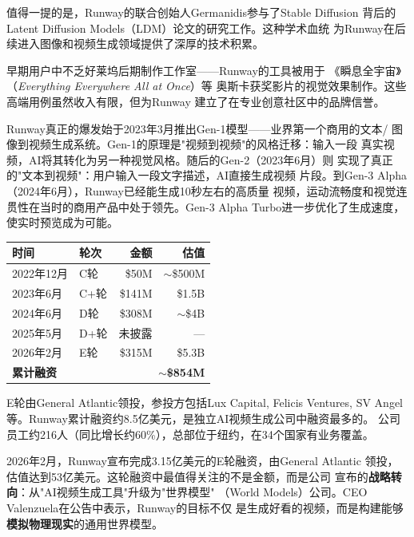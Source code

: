 值得一提的是，Runway的联合创始人Germanidis参与了Stable Diffusion
背后的Latent Diffusion Models（LDM）论文的研究工作。这种学术血统
为Runway在后续进入图像和视频生成领域提供了深厚的技术积累。

早期用户中不乏好莱坞后期制作工作室——Runway的工具被用于
《瞬息全宇宙》（\textit{Everything Everywhere All at Once}）等
奥斯卡获奖影片的视觉效果制作。这些高端用例虽然收入有限，但为Runway
建立了在专业创意社区中的品牌信誉。

Runway真正的爆发始于2023年3月推出Gen-1模型——业界第一个商用的文本/
图像到视频生成系统。Gen-1的原理是"视频到视频"的风格迁移：输入一段
真实视频，AI将其转化为另一种视觉风格。随后的Gen-2（2023年6月）则
实现了真正的"文本到视频"：用户输入一段文字描述，AI直接生成视频
片段。到Gen-3 Alpha（2024年6月），Runway已经能生成10秒左右的高质量
视频，运动流畅度和视觉连贯性在当时的商用产品中处于领先。Gen-3
Alpha Turbo进一步优化了生成速度，使实时预览成为可能。

\begin{keybox}
\small
\begin{tabularx}{\textwidth}{l l r r}
\toprule
\rowcolor{figLightGray}
\textbf{时间} & \textbf{轮次} & \textbf{金额} & \textbf{估值} \\
\midrule
2022年12月  & C轮     & \$50M    & $\sim$\$500M \\
2023年6月   & C+轮    & \$141M   & \$1.5B \\
2024年6月   & D轮     & \$308M   & $\sim$\$4B \\
2025年5月   & D+轮    & 未披露   & ---  \\
2026年2月   & E轮     & \$315M   & \$5.3B \\
\midrule
\multicolumn{2}{l}{\textbf{累计融资}} & \multicolumn{2}{r}{\textbf{$\sim$\$854M}} \\
\bottomrule
\end{tabularx}

\medskip
\noindent E轮由General Atlantic领投，参投方包括Lux Capital, Felicis Ventures,
SV Angel等。Runway累计融资约8.5亿美元，是独立AI视频生成公司中融资最多的。
公司员工约216人（同比增长约60\%），总部位于纽约，在34个国家有业务覆盖。
\end{keybox}

2026年2月，Runway宣布完成3.15亿美元的E轮融资，由General Atlantic
领投，估值达到53亿美元。这轮融资中最值得关注的不是金额，而是公司
宣布的\textbf{战略转向}：从"AI视频生成工具"升级为"世界模型"
（World Models）公司。CEO Valenzuela在公告中表示，Runway的目标不仅
是生成好看的视频，而是构建能够\textbf{模拟物理现实}的通用世界模型。

